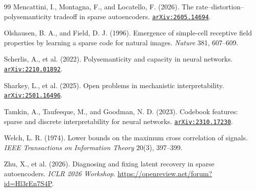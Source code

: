 \documentclass[11pt]{amsart}
\newcommand{\arxiv}[1]{\href{https://arxiv.org/abs/#1}{\texttt{arXiv:#1}}}
\theoremstyle{plain}
\theoremstyle{definition}
\begin{document}
\begin{thebibliography}{99}
 Mencattini, I., Montagna, F., and Locatello, F. (2026). The rate--distortion--polysemanticity tradeoff in sparse autoencoders. \arxiv{2605.14694}.

 Olshausen, B. A., and Field, D. J. (1996). Emergence of simple-cell receptive field properties by learning a sparse code for natural images. \emph{Nature} 381, 607--609.

 Scherlis, A., et al. (2022). Polysemanticity and capacity in neural networks. \arxiv{2210.01892}.

 Sharkey, L., et al. (2025). Open problems in mechanistic interpretability. \arxiv{2501.16496}.

 Tamkin, A., Taufeeque, M., and Goodman, N. D. (2023). Codebook features: sparse and discrete interpretability for neural networks. \arxiv{2310.17230}.

 Welch, L. R. (1974). Lower bounds on the maximum cross correlation of signals. \emph{IEEE Transactions on Information Theory} 20(3), 397--399.

 Zhu, X., et al. (2026). Diagnosing and fixing latent recovery in sparse autoencoders. \emph{ICLR 2026 Workshop}. \url{https://openreview.net/forum?id=Hl3rEn7S4P}.

\end{thebibliography}
\end{document}
